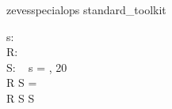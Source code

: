 \begin{zsection}
   \SECTION zevesspecialops \parents standard\_toolkit
\end{zsection}

\begin{axdef}
   s: \seq~\nat \\
   R: \nat \rel \nat \\
   S: \power~\nat
\where
   s = , 20 \rangle \\
   R \limg S \rimg = \emptyset \\
   R \limg S \rimg \subseteq S
\end{axdef}